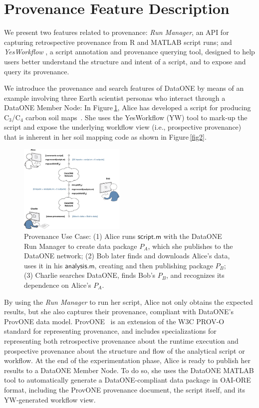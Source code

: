 \documentclass[a4paper]{llncs}
\newcommand{\code}[1]{\ensuremath{\mathsf{#1}}}
\newcommand{\Figref}[1]{Figure\,\ref{#1}}
\begin{document}
\section{Provenance Feature Description}  \label{demo}

We present two features related to provenance: \emph{Run Manager}, an API for capturing retrospective provenance from R \cite{recordr} and MATLAB \cite{matlabdataone} script runs; and \emph{YesWorkflow} \cite{yesworkflow}, a script annotation and provenance querying tool, designed to help users better understand the structure and intent of a script, and to expose and query its provenance.

We introduce the provenance and search features of DataONE by means of an example involving three Earth scientist personas who interact through a DataONE Member Node: In \Figref{fig0}, Alice has developed a script for producing C$_3$/C$_4$ carbon soil maps~\cite{MsTMIP-model-driver-data-set}.  She uses the YesWorkflow (YW) tool to mark-up the script and expose the underlying workflow view (i.e., prospective provenance) that is inherent in her soil mapping code as shown in \Figref{fig2}.

\begin{figure}[t]  
\centering 
\includegraphics[width=0.45\textwidth]{alice-bob-charlie-sequence-crop} \caption{Provenance Use Case: (1) Alice runs \code{script.m} with the DataONE Run Manager to create data package $P_A$, which she publishes to the DataONE network; (2) Bob later finds and downloads Alice's data, uses it in his \code{analysis.m}, creating and then publishing package $P_B$; (3) Charlie searches DataONE, finds Bob's $P_B$, and recognizes its dependence on Alice's $P_A$.}  \label{fig0} 
\end{figure}

By using the \emph{Run Manager} to run her script, Alice not only obtains the expected results, but she also captures their provenance, compliant with DataONE's ProvONE data model. 
ProvONE~\cite{provone} is an extension of the W3C PROV-O~\cite{prov-o} standard for representing provenance, and includes specializations for representing both retrospective provenance about the runtime execution and prospective provenance about the structure and flow of the analytical script or workflow.
%
At the end of the experimentation phase, Alice is ready to publish her results to a DataONE Member Node.  To do so, she uses the DataONE MATLAB tool to automatically generate a DataONE-compliant data package in OAI-ORE format, including the ProvONE provenance document, the script itself, and its YW-generated workflow view.
\end{document}
